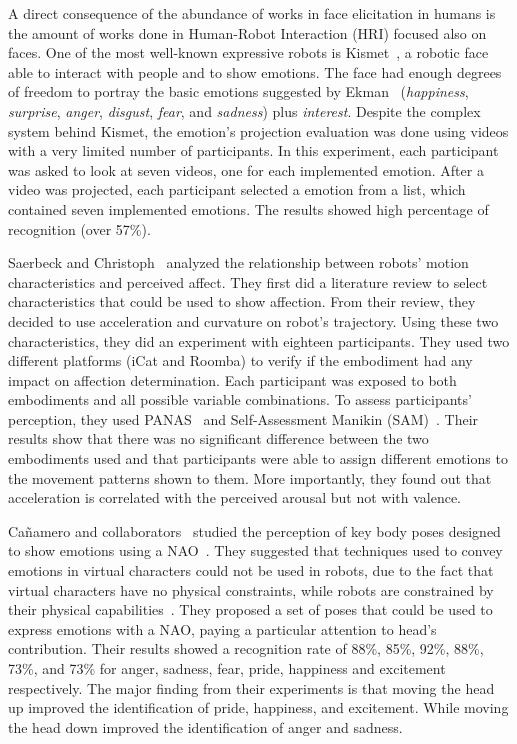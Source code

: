 A direct consequence of the abundance of works in face elicitation in humans is the amount of works done in Human-Robot Interaction (HRI) focused also on faces. One of the most well-known expressive robots is Kismet~\cite{Breazeal2002}, a robotic face able to interact with people and to show emotions. The face had enough degrees of freedom to portray the basic emotions suggested by Ekman~\cite{Ekman2004} (\textit{happiness}, \textit{surprise}, \textit{anger}, \textit{disgust}, \textit{fear}, and \textit{sadness}) plus \textit{interest}.  Despite the complex system behind Kismet, the emotion's projection evaluation was done using videos with a very limited number of participants. In this experiment, each participant was asked to look at seven videos, one for each implemented emotion. After a video was projected, each participant selected a emotion from a list, which contained seven implemented emotions. The results showed high percentage of recognition (over 57\%).

Saerbeck and Christoph~\cite{Saerbeck2010} analyzed the relationship between robots' motion characteristics and perceived affect. They first did a literature review to select characteristics that could be used to show affection. From their review, they decided to use acceleration and curvature on robot's trajectory. 
Using these two characteristics, they did an experiment with eighteen participants. They used two different platforms (iCat and Roomba) to verify if the embodiment had any impact on affection determination. Each participant was exposed to both embodiments and all possible variable combinations. To assess participants' perception, they used PANAS~\cite{WatsonClarkTellegen88} and Self-Assessment Manikin (SAM)~\cite{Lang2008}. Their results show that there was no significant difference between the two embodiments used and that participants were able to assign different emotions to the movement patterns shown to them. 
More importantly, they found out that acceleration is correlated with the perceived arousal but not with valence. 

Ca\~namero and collaborators~\cite{Canamero2010,Beck2010} studied the perception of key body poses designed to show emotions using a NAO~\cite{NAO2013}. They suggested that techniques used to convey emotions in virtual characters could not be used in robots, due to the fact that virtual characters have no physical constraints, while robots are constrained by their physical capabilities~\cite{Saerbeck2007, Canamero2010}. They proposed a set of poses that could be used to express emotions with a NAO, paying a particular attention to head's contribution. Their results showed a recognition rate of 88\%, 85\%, 92\%, 88\%, 73\%, and 73\% for anger, sadness, fear, pride, happiness and excitement respectively. The major finding from their experiments is that moving the head up improved the identification of pride, happiness, and excitement. While moving the head down improved the identification of anger and sadness. 

